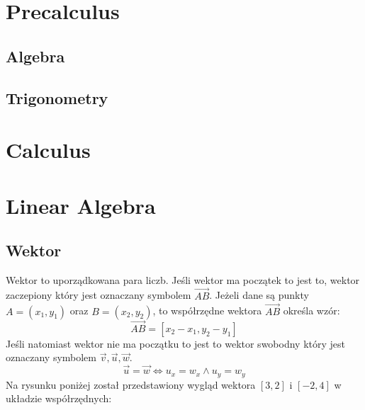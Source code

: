 \documentclass[12pt, a4paper]{article}
\begin{document}
\tableofcontents
\newpage
\section{Precalculus}
\subsection{Algebra}
\subsection{Trigonometry}
\section{Calculus}
\section{Linear Algebra}
\subsection{Wektor}
Wektor to uporządkowana para liczb. Jeśli wektor ma początek to jest to, wektor
zaczepiony który jest oznaczany symbolem $\overrightarrow{AB}$. Jeżeli dane są punkty
$A = (x_1,y_1)$ oraz $B = (x_2,y_2)$,
to współrzędne wektora $\overrightarrow{AB}$ określa wzór: $$\overrightarrow{AB} = [x_2-x_1,y_2-y_1]$$
Jeśli natomiast wektor nie ma początku to jest to wektor swobodny który
jest oznaczany symbolem $\overrightarrow{v}, \overrightarrow{u}, \overrightarrow{w}$.
$$\overrightarrow{u} = \overrightarrow{w} \Longleftrightarrow u_x = w_x \wedge u_y = w_y$$
Na rysunku poniżej został przedstawiony wygląd wektora $[3,2]$ i $[-2,4]$ w układzie współrzędnych:
\end{document}
